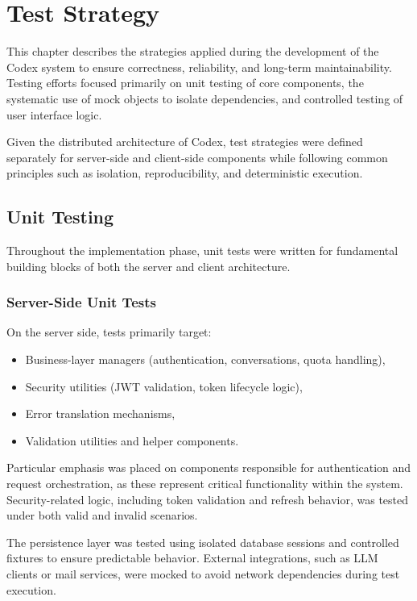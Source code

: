 
\chapter{Test Strategy}

This chapter describes the strategies applied during the development of the Codex system to ensure correctness, reliability, and long-term maintainability. Testing efforts focused primarily on unit testing of core components, the systematic use of mock objects to isolate dependencies, and controlled testing of user interface logic.

Given the distributed architecture of Codex, test strategies were defined separately for server-side and client-side components while following common principles such as isolation, reproducibility, and deterministic execution.

\section{Unit Testing}

Throughout the implementation phase, unit tests were written for fundamental building blocks of both the server and client architecture.

\subsection{Server-Side Unit Tests}

On the server side, tests primarily target:

\begin{itemize}
    \item Business-layer managers (authentication, conversations, quota handling),
    \item Security utilities (JWT validation, token lifecycle logic),
    \item Error translation mechanisms,
    \item Validation utilities and helper components.
\end{itemize}

Particular emphasis was placed on components responsible for authentication and request orchestration, as these represent critical functionality within the system. Security-related logic, including token validation and refresh behavior, was tested under both valid and invalid scenarios.

The persistence layer was tested using isolated database sessions and controlled fixtures to ensure predictable behavior. External integrations, such as LLM clients or mail services, were mocked to avoid network dependencies during test execution.

